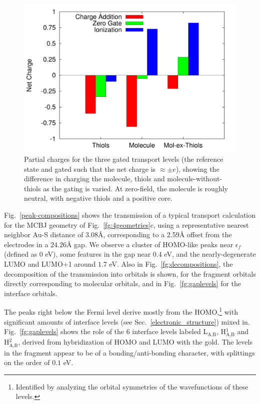 \documentclass[aip,jcp,a4paper,reprint,floatfix,superscriptaddress]{revtex4-1}
\begin{document}
\begin{figure}
\includegraphics[width=.9\columnwidth]{img/gating}
\caption{Partial charges for the three gated transport levels (the reference state and gated such that the net charge is $\approx\pm e$), showing the difference in charging the molecule, thiols and molecule-without-thiols as the gating is varied. At zero-field, the molecule is roughly neutral, with negative thiols and a positive core.} \label{fg:gated_charges}
\end{figure}

Fig.~\ref{peak-compositions} shows the transmission of a typical transport calculation for the MCBJ geometry of Fig.~\ref{fg:4geometries}c, using a representative nearest neighbor Au-S distance of 3.08\AA, corresponding to a 2.59\AA\xspace offset from the electrodes in a $24.26$\AA\xspace gap. We observe a cluster of HOMO-like peaks near $\epsilon_f$ (defined as $0$ eV), some features in the gap near $0.4$ eV, and the nearly-degenerate LUMO and LUMO+1 around $1.7$ eV. Also in Fig.~\ref{fg:decompositions}, the decomposition of the transmission into orbitals is shown, for the fragment orbitals directly corresponding to molecular orbitals, and in Fig.~\ref{fg:gaplevels} for the interface orbitals.

The peaks right below the Fermi level derive mostly from the HOMO,\footnote{Identified by analyzing the orbital symmetries of the wavefunctions of these levels.} with significant amounts of interface levels (see Sec.~\ref{electronic_structure}) mixed in.
Fig.~\ref{fg:gaplevels} shows the role of the 6 interface levels labeled L$_\text{A,B}$, H$^1_\text{A,B}$ and H$^2_\text{A,B}$, derived from hybridization of HOMO and LUMO with the gold. The levels in the fragment appear to be of a bonding/anti-bonding character, with splittings on the order of $0.1$ eV.
\end{document}
